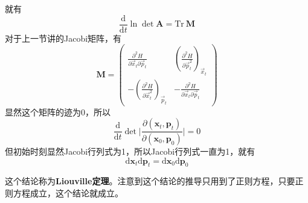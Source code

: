 \documentclass[12pt]{article}
\begin{document}
    就有
    \begin{equation}
        \frac {\mathrm{d}}{\mathrm{d}t} \ln{\det{\bm{A}}} = \mathrm{Tr}\ \bm{M}
    \end{equation}
    对于上一节讲的Jacobi矩阵，有
    \begin{equation}
        \bm{M} = 
        \begin{pmatrix}
        \frac {\partial^2 H}{\partial \vec{x}_t \partial \vec{p}_t} & (\frac {\partial^2 H}{\partial \vec{p}_t^2})_{\vec{x}_t}\\
        -(\frac {\partial^2 H}{\partial \vec{x}_t^2})_{\vec{p}_t} & - \frac {\partial^2 H}{\partial \vec{x}_t \partial \vec{p}_t}
        \end{pmatrix}
    \end{equation}
    显然这个矩阵的迹为0，所以
    \begin{equation}
        \frac {\mathrm{d}}{\mathrm{d}t} \det \bigg|\frac {\partial (\bm{x}_t,\bm{p}_t)}{\partial (\bm{x}_0,\bm{p}_0)} \bigg| = 0
    \end{equation}
    但初始时刻显然Jacobi行列式为1，所以Jacobi行列式一直为1，就有
    \begin{equation}
        \mathrm{d}\bm{x}_t \mathrm{d}\bm{p}_t = \mathrm{d}\bm{x}_0 \mathrm{d}\bm{p}_0
    \end{equation}

    这个结论称为\textbf{Liouville定理}。注意到这个结论的推导只用到了正则方程，只要正则方程成立，这个结论就成立。
\end{document}
